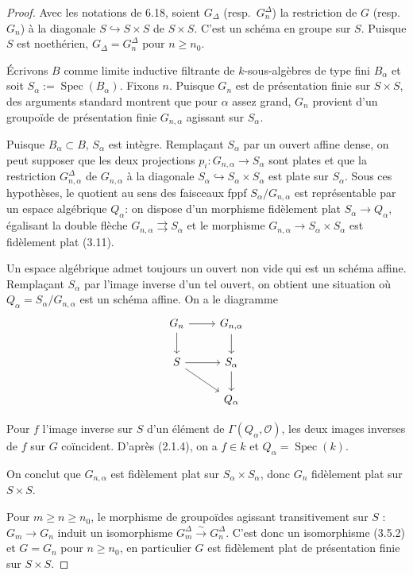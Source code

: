 \documentclass[12pt,a4paper]{article}
\theoremstyle{plain}
\theoremstyle{definition}
\DeclareMathOperator{\Spec}{Spec}
\begin{document}
\begin{proof}
Avec les notations de 6.18, soient $G_\Delta$ (resp.~$G_n^\Delta$) la restriction de $G$ (resp.~$G_n$) à la diagonale $S \hookrightarrow S \times S$ de $S \times S$. C'est un schéma en groupe sur $S$. Puisque $S$ est noethérien, $G_\Delta = G_n^\Delta$ pour $n \geq n_0$.

Écrivons $B$ comme limite inductive filtrante de $k$-sous-algèbres de type fini $B_\alpha$ et soit $S_\alpha := \Spec(B_\alpha)$. Fixons $n$. Puisque $G_n$ est de présentation finie sur $S \times S$, des arguments standard montrent que pour $\alpha$ assez grand, $G_n$ provient d'un groupoïde de présentation finie $G_{n,\alpha}$ agissant sur $S_\alpha$.

Puisque $B_\alpha \subset B$, $S_\alpha$ est intègre. Remplaçant $S_\alpha$ par un ouvert affine dense, on peut supposer que les deux projections $p_i : G_{n,\alpha} \to S_\alpha$ sont plates et que la restriction $G_{n,\alpha}^\Delta$ de $G_{n,\alpha}$ à la diagonale $S_\alpha \hookrightarrow S_\alpha \times S_\alpha$ est plate sur $S_\alpha$. Sous ces hypothèses, le quotient au sens des faisceaux fppf $S_\alpha/G_{n,\alpha}$ est représentable par un espace algébrique $Q_\alpha$: on dispose d'un morphisme fidèlement plat $S_\alpha \to Q_\alpha$, égalisant la double flèche $G_{n,\alpha} \rightrightarrows S_\alpha$ et le morphisme $G_{n,\alpha} \to S_\alpha \times S_\alpha$ est fidèlement plat (3.11).

Un espace algébrique admet toujours un ouvert non vide qui est un schéma affine. Remplaçant $S_\alpha$ par l'image inverse d'un tel ouvert, on obtient une situation où $Q_\alpha = S_\alpha/G_{n,\alpha}$ est un schéma affine. On a le diagramme
\[
\begin{tikzcd}
G_n \arrow[r] \arrow[d] & G_{n,\alpha} \arrow[d] \\
S \arrow[r] \arrow[dr] & S_\alpha \arrow[d] \\
& Q_\alpha
\end{tikzcd}
\]

Pour $f$ l'image inverse sur $S$ d'un élément de $\Gamma(Q_\alpha, \mathcal{O})$, les deux images inverses de $f$ sur $G$ coïncident. D'après (2.1.4), on a $f \in k$ et $Q_\alpha = \Spec(k)$.

On conclut que $G_{n,\alpha}$ est fidèlement plat sur $S_\alpha \times S_\alpha$, donc $G_n$ fidèlement plat sur $S \times S$.

Pour $m \geq n \geq n_0$, le morphisme de groupoïdes agissant transitivement sur $S$ : $G_m \to G_n$ induit un isomorphisme $G_m^\Delta \xrightarrow{\sim} G_n^\Delta$. C'est donc un isomorphisme (3.5.2) et $G = G_n$ pour $n \geq n_0$, en particulier $G$ est fidèlement plat de présentation finie sur $S \times S$.
\end{proof}
\end{document}
